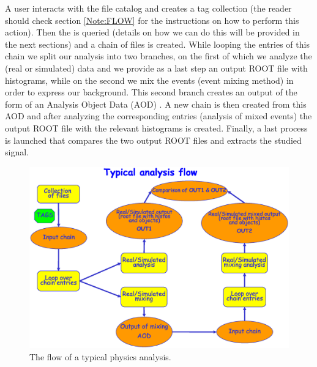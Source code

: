 A user interacts with the file catalog and creates a tag collection (the reader should check section \ref{Note:FLOW} for the instructions on how to perform this action). Then the \tag is queried (details on how we can do this will be provided in the next sections) and a chain of files is created. While looping the entries of this chain we split our analysis into two branches, on the first of which we analyze the (real or simulated) data and we provide as a last step an output ROOT file with histograms, while on the second we mix the events (event mixing method) in order to express our background. This second branch creates an output of the form of an Analysis Object Data (AOD) \cite{Note:RefComputingTDR}. A new chain is then created from this AOD and after analyzing the corresponding entries (analysis of mixed events) the output ROOT file with the relevant histograms is created. Finally, a last process is launched that compares the two output ROOT files and extracts the studied signal.


\begin{figure}[ht!]
\begin{center}
\includegraphics[width=15cm]{figures/AnalysisFramework-1.eps}
\end{center}
\caption{The flow of a typical physics analysis.}
\label{Note:FigAnalysisFramework1}
\end{figure}

